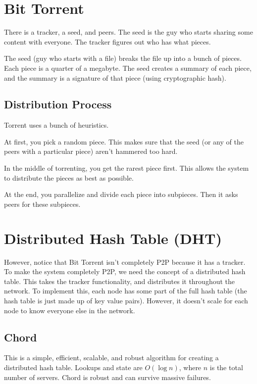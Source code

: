 \documentclass[psamsfonts]{amsart}
\begin{document}
\section{Bit Torrent}

There is a tracker, a seed, and peers. The seed is the guy who starts sharing some content with everyone. The tracker figures out who has what pieces.

The seed (guy who starts with a file) breaks the file up into a bunch of pieces. Each piece is a quarter of a megabyte. The seed creates a summary of each piece, and the summary is a signature of that piece (using cryptographic hash). 

\subsection{Distribution Process}

Torrent uses a bunch of heuristics.

At first, you pick a random piece. This makes sure that the seed (or any of the peers with a particular piece) aren't hammered too hard.

In the middle of torrenting, you get the rarest piece first. This allows the system to distribute the pieces as best as possible.

At the end, you parallelize and divide each piece into subpieces. Then it asks peers for these subpieces.

\section{Distributed Hash Table (DHT)}

However, notice that Bit Torrent isn't completely P2P because it has a tracker. To make the system completely P2P, we need the concept of a distributed hash table. This takes the tracker functionality, and distributes it throughout the network. To implement this, each node has some part of the full hash table (the hash table is just made up of key value pairs). However, it doesn't scale for each node to know everyone else in the network.

\subsection{Chord}

This is a simple, efficient, scalable, and robust algorithm for creating a distributed hash table. Lookups and state are $O(\log n)$, where $n$ is the total number of servers. Chord is robust and can survive massive failures.
\end{document}

